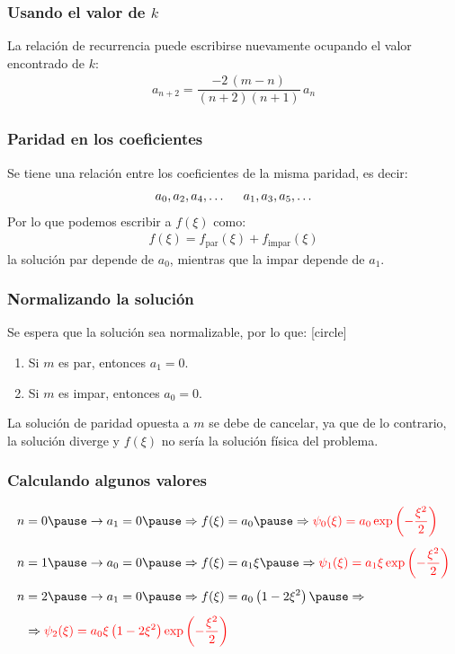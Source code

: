 \documentclass[12pt]{beamer}
\begin{document}
\begin{frame}
\frametitle{Usando el valor de $k$}
La relación de recurrencia puede escribirse nuevamente ocupando el valor encontrado de $k$:
\pause
\begin{align*}
a_{n+2} = \dfrac{-2 \, (m {-} n)}{(n {+} 2)(n {+} 1)} \, a_{n}
\end{align*}
\end{frame}
\begin{frame}
\frametitle{Paridad en los coeficientes}
Se tiene una relación entre los coeficientes de la misma paridad, es decir:
\begin{align*}
a_{0}, a_{2}, a_{4}, \ldots \hspace{0.5cm}
a_{1}, a_{3}, a_{5}, \ldots
\end{align*}
\pause
Por lo que podemos escribir a $f(\xi)$ como:
\pause
\begin{align*}
f(\xi) = f_{\mbox{par}} (\xi) + f_{\mbox{impar}} (\xi)
\end{align*}
la solución par depende de $a_{0}$, mientras que la impar depende de $a_{1}$.
\end{frame}
\begin{frame}
\frametitle{Normalizando la solución}
Se espera que la solución sea normalizable, por lo que:
[circle]
\begin{enumerate}[<+->]
\item Si $m$ es par, entonces $a_{1} = 0$.
\item Si $m$ es impar, entonces $a_{0} = 0$.
\end{enumerate}
\pause
La solución de paridad opuesta a $m$ se debe de cancelar, ya que de lo contrario, la solución diverge y $f(\xi)$ no sería la solución física del problema.
\end{frame}
\begin{frame}
\frametitle{Calculando algunos valores}
\begin{eqnarray*}
\begin{aligned}
n &= 0 \pause \rightarrow a_{1} = 0 \pause \Rightarrow f(\xi) = a_{0} \pause \Rightarrow \textcolor{red}{\psi_{0}(\xi) = a_{0} \exp \left( - \dfrac{\xi^{2}}{2} \right)} \\[0.5em]
n &= 1 \pause \rightarrow a_{0} = 0 \pause \Rightarrow f(\xi) = a_{1} \xi \pause \Rightarrow \textcolor{red}{\psi_{1}(\xi) = a_{1} \xi \exp \left( - \dfrac{\xi^{2}}{2} \right)} \\[0.5em]
n &= 2 \pause \rightarrow a_{1} = 0 \pause \Rightarrow f(\xi) = a_{0} \left( 1 - 2 \xi^{2} \right) \pause \Rightarrow \\[0.5em]
&\Rightarrow \textcolor{red}{\psi_{2}(\xi) = a_{0} \xi \left( 1 - 2 \xi^{2} \right) \exp \left( - \dfrac{\xi^{2}}{2} \right)}
\end{aligned}
\end{eqnarray*}
\end{frame}
\end{document}
